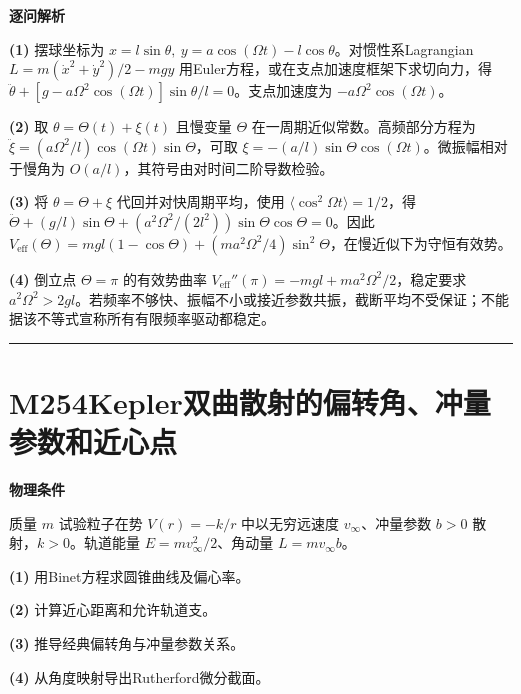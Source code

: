 \documentclass[UTF8,a4paper,11pt,oneside,openany]{ctexbook}
\begin{document}
\par\medskip\noindent\textbf{逐问解析}
\par\noindent\textbf{(1)} 摆球坐标为 \(x=l\sin\theta,\ y=a\cos(\Omega t)-l\cos\theta\)。对惯性系Lagrangian \(L=m(\dot x^2+\dot y^2)/2-mgy\) 用Euler方程，或在支点加速度框架下求切向力，得 \(\ddot\theta+[g-a\Omega^2\cos(\Omega t)]\sin\theta/l=0\)。支点加速度为 \(-a\Omega^2\cos(\Omega t)\)。
\par\noindent\textbf{(2)} 取 \(\theta=\Theta(t)+\xi(t)\) 且慢变量 \(\Theta\) 在一周期近似常数。高频部分方程为 \(\ddot\xi=(a\Omega^2/l)\cos(\Omega t)\sin\Theta\)，可取 \(\xi=-(a/l)\sin\Theta\cos(\Omega t)\)。微振幅相对于慢角为 \(O(a/l)\)，其符号由对时间二阶导数检验。
\par\noindent\textbf{(3)} 将 \(\theta=\Theta+\xi\) 代回并对快周期平均，使用 \(\langle\cos^2\Omega t\rangle=1/2\)，得 \(\ddot\Theta+(g/l)\sin\Theta+(a^2\Omega^2/(2l^2))\sin\Theta\cos\Theta=0\)。因此 \(V_{\mathrm{eff}}(\Theta)=mgl(1-\cos\Theta)+(ma^2\Omega^2/4)\sin^2\Theta\)，在慢近似下为守恒有效势。
\par\noindent\textbf{(4)} 倒立点 \(\Theta=\pi\) 的有效势曲率 \(V_{\mathrm{eff}}''(\pi)=-mgl+ma^2\Omega^2/2\)，稳定要求 \(a^2\Omega^2>2gl\)。若频率不够快、振幅不小或接近参数共振，截断平均不受保证；不能据该不等式宣称所有有限频率驱动都稳定。

\par\bigskip\hrule\bigskip
\section*{M254\quad Kepler双曲散射的偏转角、冲量参数和近心点}
\textbf{物理条件}\par 质量 \(m\) 试验粒子在势 \(V(r)=-k/r\) 中以无穷远速度 \(v_\infty\)、冲量参数 \(b>0\) 散射，\(k>0\)。轨道能量 \(E=m v_\infty^2/2\)、角动量 \(L=mv_\infty b\)。
\par\noindent\textbf{(1)} 用Binet方程求圆锥曲线及偏心率。
\par\noindent\textbf{(2)} 计算近心距离和允许轨道支。
\par\noindent\textbf{(3)} 推导经典偏转角与冲量参数关系。
\par\noindent\textbf{(4)} 从角度映射导出Rutherford微分截面。
\end{document}
